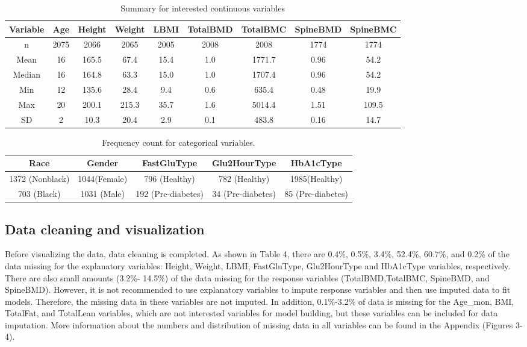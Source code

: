 \documentclass[11pt]{article}
\begin{document}
\begin{center}
            \begin{table}[ht]
			\centering 
				\caption{ Summary for interested continuous variables\label{data3}}
				\begin{tabular}{|c|c|c|c|c|c|c|c|c|}
					\hline
Variable& Age & Height	& Weight & LBMI & TotalBMD&TotalBMC&SpineBMD&SpineBMC\\\hline
n&	2075&	2066&	2065&	2005& 2008 & 2008& 1774 & 1774\\\hline
Mean&	16&	165.5&	67.4&	15.4& 1.0 & 1771.7& 0.96 & 54.2\\\hline
Median&	16&	164.8&	63.3&	15.0& 1.0 & 1707.4& 0.96 & 54.2\\\hline
Min&	12&	135.6& 28.4&	9.4& 0.6 & 635.4& 0.48 & 19.9\\\hline
Max&	20&	200.1&	215.3&	35.7& 1.6 & 5014.4& 1.51 & 109.5\\\hline
SD&	2 &	10.3&	20.4&	2.9& 0.1 & 483.8& 0.16 & 14.7\\\hline
				\end{tabular}
			\end{table}
\end{center}

            \begin{table}[ht]
			\centering
				\caption{ Frequency count for categorical variables.\label{data3}}
				\begin{tabular}{|c|c|c|c|c|}
					\hline
Race&	Gender&	FastGluType &Glu2HourType &HbA1cType \\
                	\hline
1372 (Nonblack) &	1044(Female)	&796 (Healthy)&782 (Healthy) &1985(Healthy)\\\hline
703 (Black)&	1031 (Male)&192 (Pre-diabetes)&34 (Pre-diabetes) &85 (Pre-diabetes)\\\hline
				\end{tabular}
			\end{table}
			
\subsection{Data cleaning and visualization}
Before visualizing the data, data cleaning is completed. As shown in Table 4, there are 0.4\%, 0.5\%, 3.4\%, 52.4\%, 60.7\%, and 0.2\% of the data missing for the explanatory variables: Height, Weight, LBMI, FastGluType, Glu2HourType and HbA1cType variables, respectively. There are also small amounts (3.2\%- 14.5\%) of the data missing for the response variables (TotalBMD,TotalBMC, SpineBMD, and SpineBMD). However, it is not recommended to use explanatory variables to impute response variables and then use imputed data to fit models. Therefore, the missing data in these variables are not imputed. In addition, 0.1\%-3.2\% of data is missing for the Age\_mon, BMI, TotalFat, and TotalLean variables, which are not interested variables for model building, but these variables can be included for data imputation.
More information about the numbers and distribution of missing data in all variables can be found in the Appendix (Figures 3-4).
\end{document}
